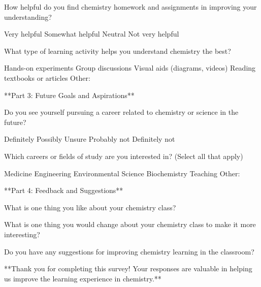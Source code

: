 \documentclass{exam}
\begin{document}
\begin{questions}
\question How helpful do you find chemistry homework and assignments in improving your understanding?  
\begin{checkboxes}
    \choice Very helpful  
    \choice Somewhat helpful  
    \choice Neutral  
    \choice Not very helpful
\end{checkboxes}
   
\question What type of learning activity helps you understand chemistry the best?  
\begin{checkboxes}  
\choice Hands-on experiments  
   \choice Group discussions  
   \choice Visual aids (diagrams, videos)  
   \choice Reading textbooks or articles  
   \choice Other:
\end{checkboxes}

**Part 3: Future Goals and Aspirations**

\question Do you see yourself pursuing a career related to chemistry or science in the future?
\begin{checkboxes}  
   \choice Definitely  
   \choice Possibly  
   \choice Unsure  
   \choice Probably not  
   \choice Definitely not
\end{checkboxes}
   
\question Which careers or fields of study are you interested in? (Select all that apply)  
   \begin{checkboxes}
   \choice Medicine  
   \choice Engineering  
   \choice Environmental Science  
   \choice Biochemistry  
   \choice Teaching  
   \choice Other:
\end{checkboxes}

**Part 4: Feedback and Suggestions**

\question What is one thing you like about your chemistry class?  

\question What is one thing you would change about your chemistry class to make it more interesting?  

\question Do you have any suggestions for improving chemistry learning in the classroom?  

\end{questions}

**Thank you for completing this survey! Your responses are valuable in helping us improve the learning experience in chemistry.**
\end{document}
